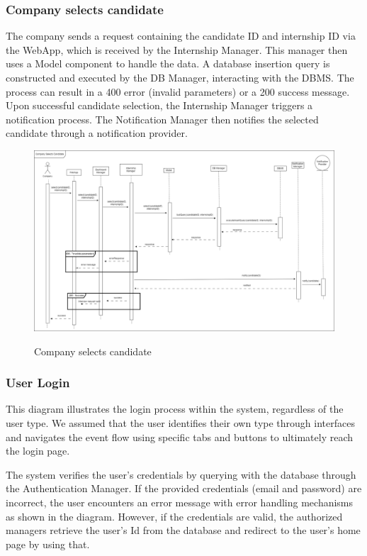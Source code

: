 \documentclass[a4paper,12pt]{article}
\begin{document}
\subsubsection*{Company selects candidate}
The company sends a request containing the candidate ID and internship ID via the WebApp, which is received by the Internship Manager. This manager then uses a Model component to handle the data. A database insertion query is constructed and executed by the DB Manager, interacting with the DBMS. The process can result in a 400 error (invalid parameters) or a 200 success message. Upon successful candidate selection, the Internship Manager triggers a notification process. The Notification Manager then notifies the selected candidate through a notification provider.
\begin{figure}[H]
\centering
\includegraphics[scale = 0.30]{DD_figures/RuntimeView/CompanySelectsCandidateRV.drawio.png}\\
\caption{Company selects candidate}
\end{figure}


    
    \subsubsection*{ User Login}
    This diagram illustrates the login process within the system, regardless of the user type. We assumed that the user identifies their own type through interfaces and navigates the event flow using specific tabs and buttons to ultimately reach the login page. 
    
    The system verifies the user's credentials by querying with the database through the Authentication Manager. If the provided credentials (email and password) are incorrect, the user encounters an error message with error handling mechanisms  as shown in the diagram. However, if the credentials are valid, the authorized managers retrieve the user's Id from the database and redirect to the user's home page by using that.
    
\end{document}
